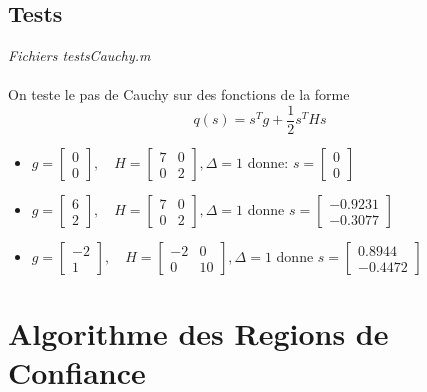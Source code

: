 \documentclass[12pt]{article}
\begin{document}
\subsection{Tests}
\begin{flushright}
\textit{Fichiers testsCauchy.m}
\end{flushright}
\paragraph{}
On teste le pas de Cauchy sur des fonctions de la forme
	\[q(s) = s^Tg + \frac{1}{2}s^THs\]
\begin{itemize}
	\item $g = \left[\begin{array}{c}0\\0\end{array}\right],\quad H = \left[\begin{array}{cc}7&0\\0&2\end{array}\right], \Delta = 1$ donne: $s = \left[\begin{array}{c}0\\0\end{array}\right]$
	\item $g = \left[\begin{array}{c}6\\2\end{array}\right],\quad H = \left[\begin{array}{cc}7&0\\0&2\end{array}\right], \Delta = 1$	donne $s = \left[\begin{array}{c}-0.9231\\-0.3077\end{array}\right]$
	\item $g = \left[\begin{array}{c}-2\\1\end{array}\right],\quad H = \left[\begin{array}{cc}-2&0\\0&10\end{array}\right], \Delta = 1$ donne $s = \left[\begin{array}{c}0.8944\\-0.4472\end{array}\right]$
\end{itemize}

\section{Algorithme des Regions de Confiance}
\end{document}
